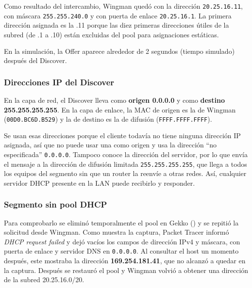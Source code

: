 Como resultado del intercambio, Wingman quedó con la dirección \texttt{20.25.16.11}, con máscara \texttt{255.255.240.0} y con puerta de enlace \texttt{20.25.16.1}. La primera dirección asignada es la .11 porque las diez primeras direcciones útiles de la subred (de .1 a .10) están excluidas del pool para asignaciones estáticas.


En la simulación, la Offer aparece alrededor de 2 segundos (tiempo simulado) después del Discover.

\subsubsection*{Direcciones IP del Discover}


En la capa de red, el Discover lleva como \textbf{origen 0.0.0.0} y como \textbf{destino 255.255.255.255}. En la capa de enlace, la MAC de origen es la de Wingman (\texttt{00D0.BC6D.B529}) y la de destino es la de difusión (\texttt{FFFF.FFFF.FFFF}).

Se usan esas direcciones porque el cliente todavía no tiene ninguna dirección IP asignada, así que no puede usar una como origen y usa la dirección ``no especificada'' \texttt{0.0.0.0}. Tampoco conoce la dirección del servidor, por lo que envía el mensaje a la dirección de difusión limitada \texttt{255.255.255.255}, que llega a todos los equipos del segmento sin que un router la reenvíe a otras redes. Así, cualquier servidor DHCP presente en la LAN puede recibirlo y responder.

\subsubsection*{Segmento sin pool DHCP}

Para comprobarlo se eliminó temporalmente el pool en Gekko () y se repitió la solicitud desde Wingman. Como muestra la captura, Packet Tracer informó \textit{DHCP request failed} y dejó vacíos los campos de dirección IPv4 y máscara, con puerta de enlace y servidor DNS en \texttt{0.0.0.0}. Al consultar el host un momento después, este mostraba la dirección \textbf{169.254.181.41}, que no alcanzó a quedar en la captura. Después se restauró el pool y Wingman volvió a obtener una dirección de la subred 20.25.16.0/20.


